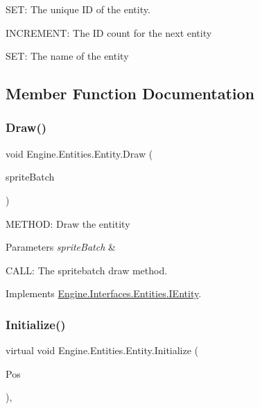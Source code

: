 S\+ET\+: The unique ID of the entity.

I\+N\+C\+R\+E\+M\+E\+NT\+: The ID count for the next entity

S\+ET\+: The name of the entity 

\subsection{Member Function Documentation}
\mbox{\label{a00314_a5c795930028c5672b54f95369b25019f}} 
\subsubsection{\texorpdfstring{Draw()}{Draw()}}
{\footnotesize\ttfamily void Engine.\+Entities.\+Entity.\+Draw (\begin{DoxyParamCaption}\item[{Sprite\+Batch}]{sprite\+Batch }\end{DoxyParamCaption})\hspace{0.3cm}{\ttfamily [inline]}}



M\+E\+T\+H\+OD\+: Draw the entitity 


\begin{DoxyParams}{Parameters}
{\em sprite\+Batch} & \\
\hline
\end{DoxyParams}
C\+A\+LL\+: The spritebatch draw method. 

Implements \hyperlink{a00438_a845918af6647460d2c47a3853a30f95f}{Engine.\+Interfaces.\+Entities.\+I\+Entity}.

\mbox{\label{a00314_aa1425aeeac379c5141e7560b84850b3d}} 
\subsubsection{\texorpdfstring{Initialize()}{Initialize()}}
{\footnotesize\ttfamily virtual void Engine.\+Entities.\+Entity.\+Initialize (\begin{DoxyParamCaption}\item[{Vector2}]{Pos }\end{DoxyParamCaption})\hspace{0.3cm}{\ttfamily [inline]}, {\ttfamily [virtual]}}




